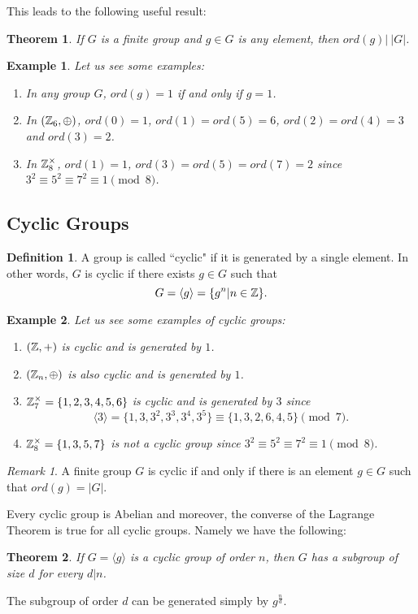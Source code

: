 \documentclass[12pt]{article}
\theoremstyle{plain}
\newtheorem{example}{Example}
\newtheorem{theorem}{Theorem}
\theoremstyle{definition}
\newtheorem{definition}{Definition}
\theoremstyle{remark}
\newtheorem{remark}{Remark}
\begin{document}
This leads to the following useful result:
\begin{theorem}
If $G$ is a finite group and $g \in G$ is any element, then 
$ord(g)| \: |G|$.
\end{theorem}
\begin{example}
Let us see some examples:
\begin{enumerate}
    \item In any group $G$, $ord(g)=1$ if and only if $g=1$.
    \item In $(\mathbb{Z}_6,\oplus)$, $ord (0)=1$, $ord(1)=ord(5)=6$, $ord(2)=ord(4)=3$ and $ord(3)=2$. 
    \item In $\mathbb{Z}_{8}^{\times}$, $ord(1)=1$, $ord(3)=ord(5)=ord(7)=2$ since $3^2\equiv 5^2\equiv 7^2 \equiv 1 \pmod{8}$. 
\end{enumerate}
\end{example}

\subsection{Cyclic Groups}
\begin{definition}
A group is called ``cyclic" if it is generated by a single element. In other words, $G$ is cyclic if there exists $g\in G$ such that 
$$G = \langle g\rangle = \{g^n|n\in \mathbb{Z}\}.$$
\end{definition}

\begin{example}
Let us see some examples of cyclic groups:
\begin{enumerate}
    \item $(\mathbb{Z},+)$ is cyclic and is generated by $1$.
    \item $(\mathbb{Z}_n, \oplus)$ is also cyclic and is generated by $1$.
    \item $\mathbb{Z}_7^{\times} = \{1,2,3,4,5,6\}$ is cyclic and is generated by $3$ since 
    $$\langle3\rangle = \{1,3,3^2, 3^3, 3^4, 3^5\} \equiv \{1,3,2,6,4,5\} \pmod{7}.$$
    \item $\mathbb{Z}_8^{\times} = \{1,3,5,7\}$ is not a cyclic group since $3^2\equiv 5^2\equiv 7^2\equiv 1 \pmod{8}$. 
\end{enumerate}
\end{example} 
\begin{remark}
A finite group $G$ is cyclic if and only if there is an element $g\in G$ such that $ord(g)=|G|$. 
\end{remark}

Every cyclic group is Abelian and moreover, the converse of the Lagrange Theorem is true for all cyclic groups. Namely we have the following:
\begin{theorem}
If $G=\langle g\rangle$ is a cyclic group of order $n$, then $G$ has a subgroup of size $d$ for every $d|n$. 
\end{theorem}
The subgroup of order $d$ can be generated simply by $g^{\frac{n}{d}}$. 
\end{document}
